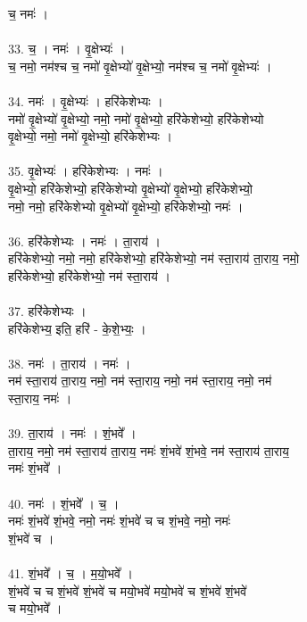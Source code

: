 च॒ नमः॑ ।\\
\\
33. च॒ । नमः॑ । वृ॒क्षेभ्यः॑ ।\\
च॒ नमो॒ नम॑श्च च॒ नमो॑ वृ॒क्षेभ्यो॑ वृ॒क्षेभ्यो॒ नम॑श्च च॒ नमो॑ वृ॒क्षेभ्यः॑ ।\\
\\
34. नमः॑ । वृ॒क्षेभ्यः॑ । हरि॑केशेभ्यः ।\\
नमो॑ वृ॒क्षेभ्यो॑ वृ॒क्षेभ्यो॒ नमो॒ नमो॑ वृ॒क्षेभ्यो॒ हरि॑केशेभ्यो॒ हरि॑केशेभ्यो\\
वृ॒क्षेभ्यो॒ नमो॒ नमो॑ वृ॒क्षेभ्यो॒ हरि॑केशेभ्यः ।\\
\\
35. वृ॒क्षेभ्यः॑ । हरि॑केशेभ्यः । नमः॑ ।\\
वृ॒क्षेभ्यो॒ हरि॑केशेभ्यो॒ हरि॑केशेभ्यो वृ॒क्षेभ्यो॑ वृ॒क्षेभ्यो॒ हरि॑केशेभ्यो॒\\
नमो॒ नमो॒ हरि॑केशेभ्यो वृ॒क्षेभ्यो॑ वृ॒क्षेभ्यो॒ हरि॑केशेभ्यो॒ नमः॑ ।\\
\\
36. हरि॑केशेभ्यः । नमः॑ । ता॒राय॑ ।\\
हरि॑केशेभ्यो॒ नमो॒ नमो॒ हरि॑केशेभ्यो॒ हरि॑केशेभ्यो॒ नम॑ स्ता॒राय॑ ता॒राय॒ नमो॒\\
हरि॑केशेभ्यो॒ हरि॑केशेभ्यो॒ नम॑ स्ता॒राय॑ ।\\
\\
37. हरि॑केशेभ्यः ।\\
हरि॑केशेभ्य॒ इति॒ हरि॑ - के॒शे॒भ्यः॒ ।\\
\\
38. नमः॑ । ता॒राय॑ । नमः॑ ।\\
नम॑ स्ता॒राय॑ ता॒राय॒ नमो॒ नम॑ स्ता॒राय॒ नमो॒ नम॑ स्ता॒राय॒ नमो॒ नम॑\\
स्ता॒राय॒ नमः॑ ।\\
\\
39. ता॒राय॑ । नमः॑ । शं॒भवे᳚ ।\\
ता॒राय॒ नमो॒ नम॑ स्ता॒राय॑ ता॒राय॒ नमः॑ शं॒भवे॑ शं॒भवे॒ नम॑ स्ता॒राय॑ ता॒राय॒\\
नमः॑ शं॒भवे᳚ ।\\
\\
40. नमः॑ । शं॒भवे᳚ । च॒ ।\\
नमः॑ शं॒भवे॑ शं॒भवे॒ नमो॒ नमः॑ शं॒भवे॑ च च शं॒भवे॒ नमो॒ नमः॑\\
शं॒भवे॑ च ।\\
\\
41. शं॒भवे᳚ । च॒ । म॒यो॒भवे᳚ ।\\
शं॒भवे॑ च च शं॒भवे॑ शं॒भवे॑ च मयो॒भवे॑ मयो॒भवे॑ च शं॒भवे॑ शं॒भवे॑\\
च मयो॒भवे᳚ ।\\
